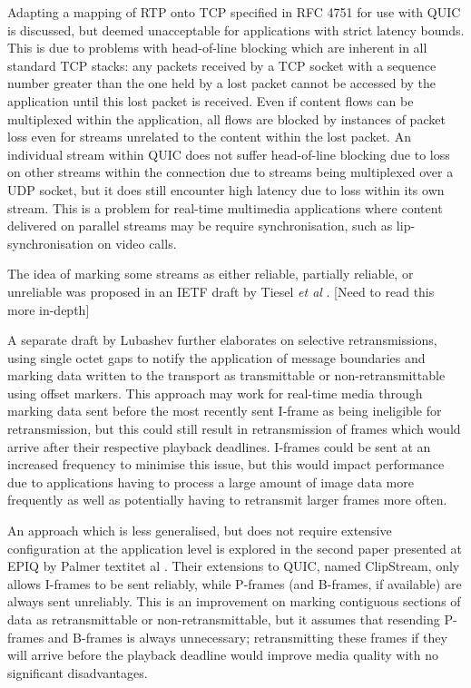 \documentclass{mprop}
\begin{document}
Adapting a mapping of RTP onto TCP specified in RFC 4751 \cite{RTP-TCP-RFC} for use with QUIC is discussed, but deemed unacceptable for applications with strict latency bounds. This is due to problems with head-of-line blocking which are inherent in all standard TCP stacks: any packets received by a TCP socket with a sequence number greater than the one held by a lost packet cannot be accessed by the application until this lost packet is received. Even if content flows can be multiplexed within the application, all flows are blocked by instances of packet loss even for streams unrelated to the content within the lost packet. An individual stream within QUIC does not suffer head-of-line blocking due to loss on other streams within the connection due to streams being multiplexed over a UDP socket, but it does still encounter high latency due to loss within its own stream. This is a problem for real-time multimedia applications where content delivered on parallel streams may be require synchronisation, such as lip-synchronisation on video calls.


The idea of marking some streams as either reliable, partially reliable, or unreliable was proposed in an IETF draft by Tiesel \textit{et al} \cite{Tiesel2017}.  [Need to read this more in-depth]

A separate draft by Lubashev \cite{Lubashev2018} further elaborates on selective retransmissions, using single octet gaps to notify the application of message boundaries and marking data written to the transport as transmittable or non-retransmittable using offset markers. This approach may work for real-time media through marking data sent before the most recently sent I-frame as being ineligible for retransmission, but this could still result in retransmission of frames which would arrive after their respective playback deadlines. I-frames could be sent at an increased frequency to minimise this issue, but this would impact performance due to applications having to process a large amount of image data more frequently as well as potentially having to retransmit larger frames more often.

An approach which is less generalised, but does not require extensive configuration at the application level is explored in the second paper presented at EPIQ by Palmer textit{et al} \cite{Palmer2018}. Their extensions to QUIC, named ClipStream, only allows I-frames to be sent reliably, while P-frames (and B-frames, if available) are always sent unreliably. This is an improvement on marking contiguous sections of data as retransmittable or non-retransmittable, but it assumes that resending P-frames and B-frames is always unnecessary; retransmitting these frames if they will arrive before the playback deadline would improve media quality with no significant disadvantages.
\end{document}
